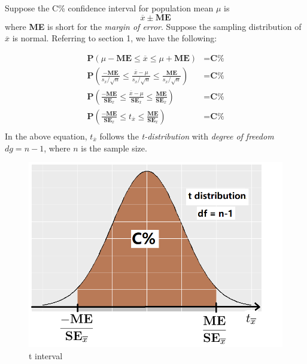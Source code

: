 \documentclass[a4paper, 12pt,twoside]{book}
\begin{document}
   Suppose the C\% confidence interval for population mean 
   $\mu$ is $$\overline{x} \pm \textbf{ME}$$ 
   where \textbf{ME} is short for the \textit{margin of error}. Suppose the sampling distribution of $\overline{x}$ is normal. Referring to section 1, we have the following:
   
   \begin{equation*}
   \begin{split}
   \textbf{P}(\mu - \textbf{ME} \leq \overline{x} \leq \mu + \textbf{ME}) &= \textbf{C\% }\\   
\textbf{P}(\frac{-\textbf{ME}}{s_{x}/\sqrt{n}}\leq \frac{\overline{x}-\mu}{s_{x}/\sqrt{n}} \leq \frac{\textbf{ME}}{s_{x}/\sqrt{n}})& = \textbf{C\%} \\
   \textbf{P}(\frac{-\textbf{ME}}{\textbf{SE}_{\overline{x}}}\leq \frac{\overline{x}-\mu}{\textbf{SE}_{\overline{x}}} \leq \frac{\textbf{ME}}{\textbf{SE}_{\overline{x}}}) &= \textbf{C\%} \\
    \textbf{P}(\frac{-\textbf{ME}}{\textbf{SE}_{\overline{x}}}\leq t_{\overline{x}} \leq \frac{\textbf{ME}}{\textbf{SE}_{\overline{x}}}) &= \textbf{C\%} \\            
    \end{split}          
 \end{equation*}
 In the above equation, $t_{\overline{x}}$ follows the \textit{t-distribution} with \textit{degree of freedom} $dg = n-1$, where $n$ is the sample size.
    \begin{figure}[H]
       \centering
       \includegraphics[scale=0.6]{tInterval}
       \caption{t interval}
       \label{tInterval}
    \end{figure}
    
\end{document}

